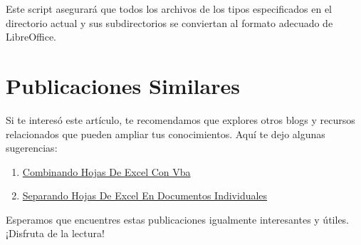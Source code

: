 \documentclass[
  jou,
  floatsintext,
  longtable,
  a4paper,
  nolmodern,
  notxfonts,
  notimes,
  12pt,
  colorlinks=true,linkcolor=blue,citecolor=blue,urlcolor=blue]{apa7}
\providecommand{\tightlist}{%
  \setlength{\itemsep}{0pt}\setlength{\parskip}{0pt}}
\begin{document}
Este script asegurará que todos los archivos de los tipos especificados
en el directorio actual y sus subdirectorios se conviertan al formato
adecuado de LibreOffice.

\section{Publicaciones Similares}\label{publicaciones-similares}

Si te interesó este artículo, te recomendamos que explores otros blogs y
recursos relacionados que pueden ampliar tus conocimientos. Aquí te dejo
algunas sugerencias:

\begin{enumerate}
\def\labelenumi{\arabic{enumi}.}
\tightlist
\item
  \href{https://numerus-scriptum.netlify.app/ofimatica/2023-05-31-combinando-hojas-de-excel-con-vba/index.pdf}{}
  \href{https://numerus-scriptum.netlify.app/ofimatica/2023-05-31-combinando-hojas-de-excel-con-vba}{Combinando
  Hojas De Excel Con Vba}
\item
  \href{https://numerus-scriptum.netlify.app/ofimatica/2023-06-05-separando-hojas-de-excel-en-documentos-individuales/index.pdf}{}
  \href{https://numerus-scriptum.netlify.app/ofimatica/2023-06-05-separando-hojas-de-excel-en-documentos-individuales}{Separando
  Hojas De Excel En Documentos Individuales}
\end{enumerate}

Esperamos que encuentres estas publicaciones igualmente interesantes y
útiles. ¡Disfruta de la lectura!
\end{document}
